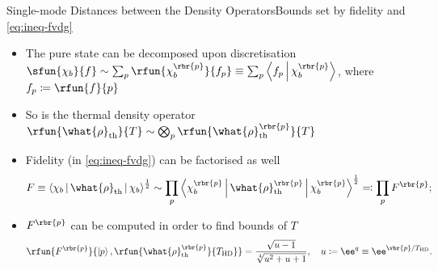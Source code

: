\documentclass{beamer}
\begin{document}
\begin{frame}[allowframebreaks]{Single-mode Distances between the Density 
Operators}{Bounds set by fidelity and \cref{eq:ineq-fvdg}}

\begin{itemize}


\item The pure state can be decomposed upon discretisation 
$\sfun{\chi_b}{f} \sim \sum_p \rfun{\chi_b^\rbr{p}}{f_p} \equiv \sum_p 
\Braket{f_p | \chi_b^{\rbr{p}}}$, where $f_p \coloneqq \rfun{f}{p}$

\item So is the thermal density operator $\rfun{\what{\rho}_\text{th}}{T} \sim
\bigotimes_p \rfun{\what{\rho}_\text{th}^\rbr{p}}{T}$

\item Fidelity (in \cref{eq:ineq-fvdg}) can be factorised as well
\begin{equation}
F \equiv \Braket{\chi_b | \what{\rho}_\text{th} | \chi_b}^\frac{1}{2} \sim
\prod_p \Braket{\chi_b^{\rbr{p}} | \what{\rho}_\text{th}^{\rbr{p}}
| \chi_b^{\rbr{p}}}^\frac{1}{2} \eqqcolon \prod_p F^{\rbr{p}};
\end{equation}
\item $F^{\rbr{p}}$ can be computed \alert{in order to find bounds of $T$}
\begin{equation}
\rfun{F^{\rbr{p}}}{\Ket{p},\rfun{\what{\rho}_\text{th}^\rbr{p}}{T_\text{HD}}}
= \frac{\sqrt{u-1}}{\sqrt[4]{u^2+u+1}},\quad
u \coloneqq \ee^q \equiv \ee^{\vbr{p}/T_\text{HD}}.
\label{eq:fidelity-pt}
\end{equation}
\end{itemize}

%

\end{frame}
\end{document}
